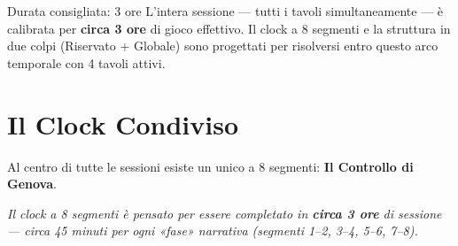 
\begin{rulebox}[GoldRPG]{Durata consigliata: 3 ore}
L'intera sessione --- tutti i tavoli simultaneamente --- è calibrata per
\textbf{circa 3 ore} di gioco effettivo. Il clock a 8 segmenti e la
struttura in due colpi (Riservato + Globale) sono progettati per
risolversi entro questo arco temporale con 4 tavoli attivi.
\end{rulebox}

\section{Il Clock Condiviso}
\label{sec:clock}


Al centro di tutte le sessioni esiste un unico  a 8 segmenti:
\textbf{Il Controllo di Genova}.


\textit{\small Il clock a 8 segmenti è pensato per essere completato in
\textbf{circa 3 ore} di sessione — circa 45 minuti per ogni «fase» narrativa
(segmenti 1–2, 3–4, 5–6, 7–8).}

